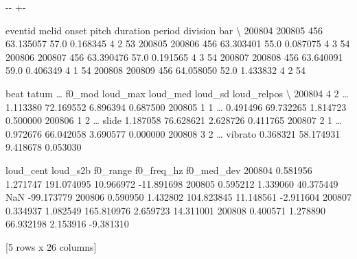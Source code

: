 \documentclass[letterpaper,10pt,english]{sphinxmanual}
\newlength\nbsphinxcodecellspacing
\begin{document}
{
\begin{sphinxVerbatim}[commandchars=\\\{\}]
\llap{\color{nbsphinxin}[9]:\,\hspace{\fboxrule}\hspace{\fboxsep}}
\end{sphinxVerbatim}
}

{

\kern-\sphinxverbatimsmallskipamount\kern-\baselineskip
\kern+\FrameHeightAdjust\kern-\fboxrule
\vspace{\nbsphinxcodecellspacing}

\begin{sphinxVerbatim}[commandchars=\\\{\}]
\llap{\color{nbsphinxout}[9]:\,\hspace{\fboxrule}\hspace{\fboxsep}}        eventid  melid      onset  pitch  duration  period  division  bar  \textbackslash{}
200804   200805    456  63.135057   57.0  0.168345       4         2   53
200805   200806    456  63.303401   55.0  0.087075       4         3   54
200806   200807    456  63.390476   57.0  0.191565       4         3   54
200807   200808    456  63.640091   59.0  0.406349       4         1   54
200808   200809    456  64.058050   52.0  1.433832       4         2   54

        beat  tatum  {\ldots}   f0\_mod  loud\_max   loud\_med   loud\_sd  loud\_relpos  \textbackslash{}
200804     4      2  {\ldots}           1.113380  72.169552  6.896394     0.687500
200805     1      1  {\ldots}           0.491496  69.732265  1.814723     0.500000
200806     1      2  {\ldots}    slide  1.187058  76.628621  2.628726     0.411765
200807     2      1  {\ldots}           0.972676  66.042058  3.690577     0.000000
200808     3      2  {\ldots}  vibrato  0.368321  58.174931  9.418678     0.053030

       loud\_cent  loud\_s2b    f0\_range  f0\_freq\_hz  f0\_med\_dev
200804  0.581956  1.271747  191.074095   10.966972  -11.891698
200805  0.595212  1.339060   40.375449         NaN  -99.173779
200806  0.590950  1.432802  104.823845   11.148561   -2.911604
200807  0.334937  1.082549  165.810976    2.659723   14.311001
200808  0.400571  1.278890   66.932198    2.153916   -9.381310

[5 rows x 26 columns]
\end{sphinxVerbatim}
}
\end{document}
